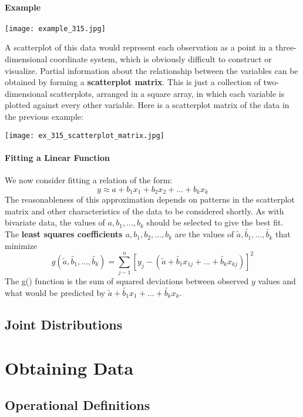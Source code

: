 \documentclass{article}
\newcommand{\p}[1]{\paragraph{#1}} %
\begin{document}
	\p{Example}
	\begin{center}
		\texttt{[image: example\_315.jpg]}
	\end{center}
	
	A scatterplot of this data would represent each observation as a point in a three-dimensional 
	coordinate system, which is obviously difficult to construct or visualize. Partial information about 
	the relationship between the variables can be obtained by forming a \textbf{scatterplot matrix}. 
	This is just a collection of two-dimensional scatterplots, arranged in a square array, in which 
	each variable is plotted against every other variable. Here is a scatterplot matrix of the data in 
	the previous example: 
	
	\begin{center}
		\texttt{[image: ex\_315\_scatterplot\_matrix.jpg]}
	\end{center}
	
	\p{Fitting a Linear Function}
		We now consider fitting a relation of the form: 
		\[ y \approx a + b_1x_1 + b_2x_2 +...+ b_kx_k \]
		The reasonableness of this approximation depends on patterns in the scatterplot matrix 
		and other characteristics of the data to be considered shortly. As with bivariate data, the 
		values of $a, b_1,...,b_k$ should be selected to give the best fit. \\
		The \textbf{least squares coefficients $a,b_1,b_2,...,b_k$} are the values of $\tilde{a},
		\tilde{b_1},...,\tilde{b_k}$ that minimize
		\[ g(\tilde{a},\tilde{b_1},...,\tilde{b_k}) = \sum_{j-1}^n [y_j - (\tilde{a} + \tilde{b_1}x_{1j}+...+
		\tilde{b_k}x_{kj})]^2 \]
		The g() function is the sum of squared deviations between observed $y$ values and what 
		would be predicted by $\tilde{a} + \tilde{b_1}x_1 +...+ \tilde{b_k}x_k$.
		
	\subsection{Joint Distributions} %

\clearpage	 %
\section{Obtaining Data} %

	\subsection{Operational Definitions} %
	
\end{document}
